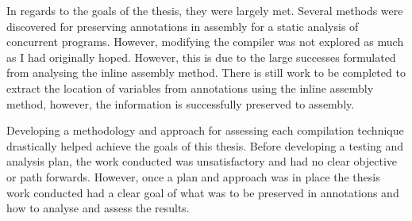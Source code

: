 In regards to the goals of the thesis, they were largely met. Several methods were discovered for preserving annotations in assembly for a static analysis of concurrent programs. However, modifying the compiler was not explored as much as I had originally hoped. However, this is due to the large successes formulated from analysing the inline assembly method. There is still work to be completed to extract the location of variables from annotations using the inline assembly method, however, the information is successfully preserved to assembly. 

Developing a methodology and approach for assessing each compilation technique drastically helped achieve the goals of this thesis. Before developing a testing and analysis plan, the work conducted was unsatisfactory and had no clear objective or path forwards. However, once a plan and approach was in place the thesis work conducted had a clear goal of what was to be preserved in annotations and how to analyse and assess the results.
